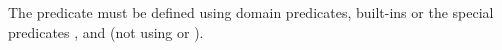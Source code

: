 \begin{note}
The predicate  must be defined using domain predicates, built-ins or the special 
predicates ,  and  
(not using  or ).
\end{note}


